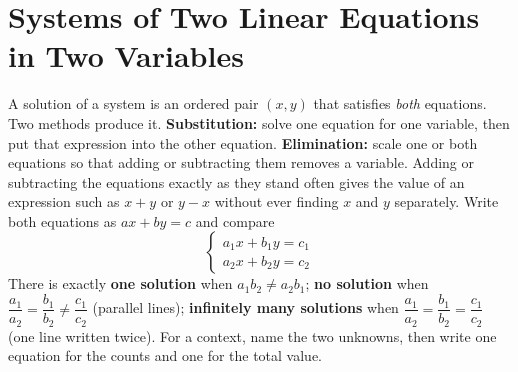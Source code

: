 \chapter{Systems of Two Linear Equations in Two Variables}

\begin{essentials}
A solution of a system is an ordered pair $(x,y)$ that satisfies
\emph{both} equations. Two methods produce it.
\textbf{Substitution:} solve one equation for one variable, then put that
expression into the other equation.
\textbf{Elimination:} scale one or both equations so that adding or
subtracting them removes a variable.
Adding or subtracting the equations exactly as they stand often gives the
value of an expression such as $x+y$ or $y-x$ without ever finding $x$ and
$y$ separately.
Write both equations as $ax+by=c$ and compare
\[ \begin{cases} a_1x + b_1y = c_1 \\ a_2x + b_2y = c_2 \end{cases} \]
There is exactly \textbf{one solution} when $a_1b_2 \ne a_2b_1$;
\textbf{no solution} when
$\dfrac{a_1}{a_2} = \dfrac{b_1}{b_2} \ne \dfrac{c_1}{c_2}$ (parallel lines);
\textbf{infinitely many solutions} when
$\dfrac{a_1}{a_2} = \dfrac{b_1}{b_2} = \dfrac{c_1}{c_2}$ (one line written
twice). For a context, name the two unknowns, then write one equation for
the counts and one for the total value.
\end{essentials}

